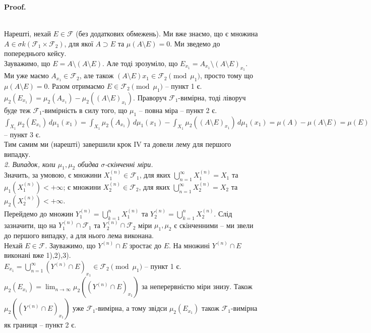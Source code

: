 \documentclass[a4paper, 10pt]{article}
\makeatletter
\theoremstyle{theoremdd}
\renewenvironment{proof}[1][Proof.\\]{\par
\pushQED{\hfill \qed}%
\normalfont \topsep6\p@\@plus6\p@\relax
\trivlist
\item\relax
{\bfseries
#1\@addpunct{.}}\hspace\labelsep\ignorespaces
}{%
\popQED\endtrivlist\@endpefalse
}
\makeatother
\begin{document}
\begin{proof}
\bigskip \\
Нарешті, нехай $E \in \mathcal{F}$ (без додаткових обмежень). Ми вже знаємо, що є множина $A \in \sigma k(\mathcal{F}_1 \times \mathcal{F}_2)$, для якої $A \supset E$ та $\mu(A \setminus E) = 0$. Ми зведемо до попереднього кейсу.\\
Зауважимо, що $E = A \setminus (A \setminus E)$. Але тоді зрозуміло, що $E_{x_1} = A_{x_1} \setminus (A \setminus E)_{x_1}$. Ми уже маємо $A_{x_1} \in \mathcal{F}_2$, але також $(A \setminus E){x_1} \in \mathcal{F}_2 \pmod {\mu_1}$, просто тому що $\mu(A \setminus E) = 0$. Разом отримаємо $E \in \mathcal{F}_2 \pmod {\mu_1}$ -- пункт 1 є.\\
$\mu_2\left(E_{x_1}\right) = \mu_2\left( A_{x_1} \right) - \mu_2\left( (A \setminus E)_{x_1} \right)$. Праворуч $\mathcal{F}_1$-вимірна, тоді ліворуч буде теж $\mathcal{F}_1$-вимірність в силу того, що $\mu_1$ -- повна міра -- пункт 2 є.\\
$\displaystyle\int_{X_1} \mu_2\left(E_{x_1}\right)\,d\mu_1(x_1) = \displaystyle\int_{X_1} \mu_2\left( A_{x_1} \right)\,d\mu_1(x_1) - \int_{X_1}\mu_2\left( (A \setminus E)_{x_1} \right)\,d\mu_1(x_1) = \mu(A) - \mu(A \setminus E) = \mu(E)$ -- пункт 3 є.\\
Тим самим ми (нарешті) завершили крок IV та довели лему для першого випадку.
\bigskip \\
\textit{2. Випадок, коли $\mu_1,\mu_2$ обидва $\sigma$-скінченні міри.}\\
Значить, за умовою, є множини $X_1^{(n)} \in \mathcal{F}_1$, для яких $\displaystyle\bigcup_{n=1}^\infty X_1^{(n)} = X_1$ та $\mu_1\left( X_1^{(n)}\right) < +\infty$; є множини $X_2^{(n)} \in \mathcal{F}_2$, для яких $\displaystyle\bigcup_{n=1}^\infty X_2^{(n)} = X_2$ та $\mu_2\left( X_2^{(n)}\right) < +\infty$.\\
Перейдемо до множин $Y_1^{(n)} = \displaystyle\bigcup_{k=1}^n X_1^{(n)}$ та $Y_2^{(n)} = \displaystyle\bigcup_{k=1}^n X_2^{(n)}$. Слід зазначити, що на $Y_1^{(n)} \cap \mathcal{F}_1$ та $Y_2^{(n)} \cap \mathcal{F}_2$ міри $\mu_1,\mu_2$ є скінченними -- ми звели до першого випадку, а для нього лема виконана.\\
Нехай $E \in \mathcal{F}$. Зауважимо, що $Y^{(n)} \cap E$ зростає до $E$. На множині $Y^{(n)} \cap E$ виконані вже 1),2),3).\\
$E_{x_1} = \displaystyle\bigcup_{n=1}^\infty (Y^{(n)} \cap E)_{x_1} \in \mathcal{F}_2 \pmod{\mu_1}$ -- пункт 1 є.\\
$\mu_2(E_{x_1}) = \displaystyle\lim_{n \to \infty} \mu_2\left(\left(Y^{(n)} \cap E\right)_{x_1}\right)$ за неперервністю міри знизу. Також $\mu_2\left(\left(Y^{(n)} \cap E\right)_{x_1}\right)$ уже $\mathcal{F}_1$-вимірна, а тому звідси $\mu_2(E_{x_1})$ також $\mathcal{F}_1$-вимірна як границя -- пункт 2 є.\\

\end{proof}
\end{document}
